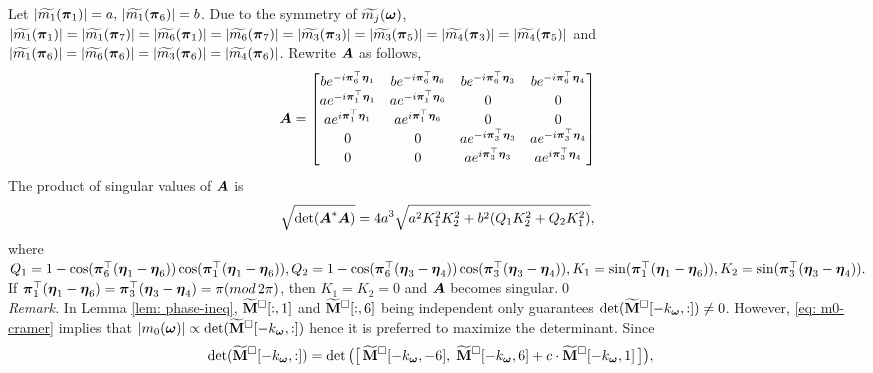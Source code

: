 Let $|\widetilde{m_1}(\boldsymbol{\pi}_1)| = a, \, |\widetilde{m_1}(\boldsymbol{\pi}_6)|=b$. Due to the symmetry of $\widetilde{m_{j}}(\boldsymbol{\omega})$,
$|\widetilde{m_1}(\boldsymbol{\pi}_1)| = |\widetilde{m_1}(\boldsymbol{\pi}_7)| = |\widetilde{m_6}(\boldsymbol{\pi}_1)| = |\widetilde{m_6}(\boldsymbol{\pi}_7)| = |\widetilde{m_3}(\boldsymbol{\pi}_3)| = |\widetilde{m_3}(\boldsymbol{\pi}_5)| = |\widetilde{m_4}(\boldsymbol{\pi}_3)| = |\widetilde{m_4}(\boldsymbol{\pi}_5)|$ and $|\widetilde{m_1}(\boldsymbol{\pi}_6)|=| \widetilde{m_6}(\boldsymbol{\pi}_6)|= | \widetilde{m_3}(\boldsymbol{\pi}_6)|=| \widetilde{m_4}(\boldsymbol{\pi}_6)|$. Rewrite $\boldsymbol{A}$ as follows,
$$\boldsymbol{A}=
\begin{bmatrix}
b e^{-i\boldsymbol{\pi}_6^\top\boldsymbol{\eta}_1} & b e^{-i\boldsymbol{\pi}_6^\top\boldsymbol{\eta}_6} & b e^{-i\boldsymbol{\pi}_6^\top\boldsymbol{\eta}_3} & b e^{-i\boldsymbol{\pi}_6^\top\boldsymbol{\eta}_4}\\
a e^{-i\boldsymbol{\pi}_1^\top\boldsymbol{\eta}_1} & a e^{-i\boldsymbol{\pi}_1^\top\boldsymbol{\eta}_6} & 0						& 0 \\
a e^{i\boldsymbol{\pi}_1^\top\boldsymbol{\eta}_1} & a e^{i\boldsymbol{\pi}_1^\top\boldsymbol{\eta}_6} & 0						& 0 \\
0 					& 0 					& a e^{-i\boldsymbol{\pi}_3^\top\boldsymbol{\eta}_3} & a e^{-i\boldsymbol{\pi}_3^\top\boldsymbol{\eta}_4}\\
0 					& 0 					& a e^{i\boldsymbol{\pi}_3^\top\boldsymbol{\eta}_3} & a e^{i\boldsymbol{\pi}_3^\top\boldsymbol{\eta}_4}\\
\end{bmatrix}
$$
The product of singular values of $\boldsymbol{A}$ is 
\begin{align}\label{eq: detB}
\sqrt{\text{det}(\boldsymbol{A}^* \boldsymbol{A})} = 4a^3\sqrt{a^2 K_1^2K_2^2 + b^2(Q_1K_2^2 + Q_2K_1^2)},
\end{align}
where $ Q_1 = 1 - \cos(\boldsymbol{\pi}_6^\top(\boldsymbol{\eta}_1-\boldsymbol{\eta}_6))\cos(\boldsymbol{\pi}_1^\top(\boldsymbol{\eta}_1-\boldsymbol{\eta}_6)), Q_2 = 1 - \cos(\boldsymbol{\pi}_6^\top(\boldsymbol{\eta}_3-\boldsymbol{\eta}_4))\cos(\boldsymbol{\pi}_3^\top(\boldsymbol{\eta}_3-\boldsymbol{\eta}_4)), K_1 = \sin(\boldsymbol{\pi}_1^\top(\boldsymbol{\eta}_1-\boldsymbol{\eta}_6)), K_2 = \sin(\boldsymbol{\pi}_3^\top(\boldsymbol{\eta}_3-\boldsymbol{\eta}_4)).$ If $\boldsymbol{\pi}_1^\top(\boldsymbol{\eta}_1-\boldsymbol{\eta}_6) = \boldsymbol{\pi}_3^\top(\boldsymbol{\eta}_3-\boldsymbol{\eta}_4) = \pi (mod\, 2\pi)$, then $K_1 = K_2 = 0$ and $\boldsymbol{A}$ becomes singular.\qed\\[.5em]
{\it Remark.} In Lemma \ref{lem: phase-ineq}, $\widetilde{\mathbf{M}}^{\Box}[:,1]$ and $\widetilde{\mathbf{M}}^{\Box}[:,6]$ being independent only guarantees $\det(\widetilde{\mathbf{M}}^{\Box}[-k_{\boldsymbol{\omega}},:])\neq 0$. However, \eqref{eq: m0-cramer} implies that $|m_0(\boldsymbol{\omega})|\propto \det(\widetilde{\mathbf{M}}^{\Box}[-k_{\boldsymbol{\omega}},:])$ hence it is preferred to maximize the determinant. Since
\begin{align*}
\det(\widetilde{\mathbf{M}}^{\Box}[-k_{\boldsymbol{\omega}}, :]) = \det\big(\big[\, \widetilde{\mathbf{M}}^{\Box}[-k_{\boldsymbol{\omega}},-6], \;\widetilde{\mathbf{M}}^{\Box}[-k_{\boldsymbol{\omega}},6] + c \cdot\widetilde{\mathbf{M}}^{\Box}[-k_{\boldsymbol{\omega}},1]  \,\big]\big),\quad 
\end{align*}
